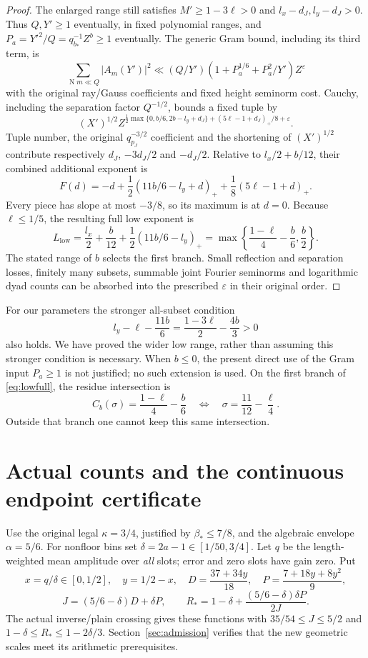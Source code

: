 \documentclass[11pt,a4paper]{article}
\theoremstyle{definition}
\newcommand{\N}{\operatorname{N}}
\newcommand{\eps}{\varepsilon}
\newcommand{\bet}{\beta_*}
\begin{document}
\begin{proof}
The enlarged range still satisfies
$M'\ge1-3\ell>0$ and $l_x-d_J,l_y-d_J>0$.
Thus $Q,Y'\ge1$ eventually, in fixed polynomial ranges, and
$P_a=Y'^2/Q=q_{b_*}^{-1}Z^b\ge1$ eventually.
The generic Gram bound, including its third term, is
\[
 \sum_{\N m\ll Q}|A_m(Y')|^2
 \ll (Q/Y')(1+P_a^{1/6}+P_a^2/Y')Z^\eps
\]
with the original ray/Gauss coefficients and fixed height
seminorm cost.
Cauchy, including the separation factor $Q^{-1/2}$, bounds a
fixed tuple by
\[
 (X')^{1/2}
 Z^{\frac12\max\{0,b/6,2b-l_y+d_J\}
        +(5\ell-1+d_J)_+/8+\eps}.
\]
Tuple number, the original $q_{p_J}^{-3/2}$ coefficient and the
shortening of $(X')^{1/2}$ contribute respectively $d_J$,
$-3d_J/2$ and $-d_J/2$.
Relative to $l_x/2+b/12$, their combined additional exponent is
\[
 F(d)=-d+\frac12(11b/6-l_y+d)_+
                 +\frac18(5\ell-1+d)_+ .
\]
Every piece has slope at most $-3/8$, so its maximum is at $d=0$.
Because $\ell\le1/5$, the resulting full low exponent is
\begin{equation}\label{eq:lowfull}
 L_{\mathrm{low}}
 =\frac{l_x}{2}+\frac b{12}
       +\frac12(11b/6-l_y)_+
 =\max\left\{\frac{1-\ell}{4}-\frac b6,\frac b2\right\}.
\end{equation}
The stated range of $b$ selects the first branch.
Small reflection and separation losses, finitely many subsets,
summable joint Fourier seminorms and logarithmic dyad counts can
be absorbed into the prescribed $\eps$ in their original order.
\end{proof}

For our parameters the stronger all-subset condition
\[
 l_y-\ell-\frac{11b}{6}
 =\frac{1-3\ell}{2}-\frac{4b}{3}>0
\]
also holds. We have proved the wider low range, rather than
assuming this stronger condition is necessary.
When $b\le0$, the present direct use of the Gram input
$P_a\ge1$ is not justified; no such extension is used.
On the first branch of \eqref{eq:lowfull}, the residue intersection is
\begin{equation}\label{eq:intersection}
 C_b(\sigma)=\frac{1-\ell}{4}-\frac b6
 \quad\Longleftrightarrow\quad
 \sigma=\frac{11}{12}-\frac\ell4.
\end{equation}
Outside that branch one cannot keep this same intersection.

\section{Actual counts and the continuous endpoint certificate}
\label{sec:certificate}
Use the original legal $\kappa=3/4$, justified by $\bet\le7/8$,
and the algebraic envelope $\alpha=5/6$.
For nonfloor bins set $\delta=2a-1\in[1/50,3/4]$.
Let $q$ be the length-weighted mean amplitude over \emph{all} slots;
error and zero slots have gain zero. Put
\[
 x=q/\delta\in[0,1/2],\quad y=1/2-x,\quad
 D=\frac{37+34y}{18},\quad P=\frac{7+18y+8y^2}{9},
\]
\begin{equation}\label{eq:counts}
 J=(5/6-\delta)D+\delta P,\qquad
 R_*=1-\delta+\frac{(5/6-\delta)\delta P}{2J}.
\end{equation}
The actual inverse/plain crossing gives these functions with
$35/54\le J\le5/2$ and $1-\delta\le R_*\le1-2\delta/3$.
Section~\ref{sec:admission} verifies that the new geometric
scales meet its arithmetic prerequisites.
\end{document}
